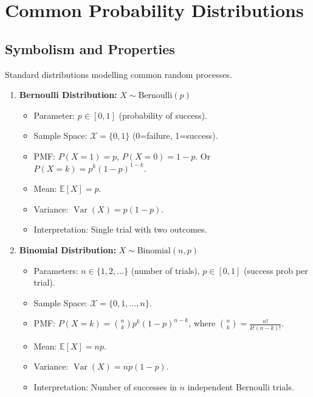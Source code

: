 \documentclass{article}
\newcommand{\E}{\mathbb{E}}    %
\DeclareMathOperator{\Var}{Var} %
\begin{document}
\section{Common Probability Distributions}

\subsection*{Symbolism and Properties}
Standard distributions modelling common random processes.

\begin{enumerate}
    \item \textbf{Bernoulli Distribution:} $X \sim \text{Bernoulli}(p)$
        \begin{itemize}
            \item Parameter: $p \in [0, 1]$ (probability of success).
            \item Sample Space: $\mathcal{X} = \{0, 1\}$ (0=failure, 1=success).
            \item PMF: $P(X=1) = p$, $P(X=0) = 1-p$. Or $P(X=k) = p^k (1-p)^{1-k}$.
            \item Mean: $\E[X] = p$.
            \item Variance: $\Var(X) = p(1-p)$.
            \item Interpretation: Single trial with two outcomes.
        \end{itemize}

    \item \textbf{Binomial Distribution:} $X \sim \text{Binomial}(n, p)$
        \begin{itemize}
            \item Parameters: $n \in \{1, 2, ...\}$ (number of trials), $p \in [0, 1]$ (success prob per trial).
            \item Sample Space: $\mathcal{X} = \{0, 1, \dots, n\}$.
            \item PMF: $P(X=k) = \binom{n}{k} p^k (1-p)^{n-k}$, where $\binom{n}{k} = \frac{n!}{k!(n-k)!}$.
            \item Mean: $\E[X] = np$.
            \item Variance: $\Var(X) = np(1-p)$.
            \item Interpretation: Number of successes in $n$ independent Bernoulli trials.
        \end{itemize}


\end{enumerate}
\end{document}
